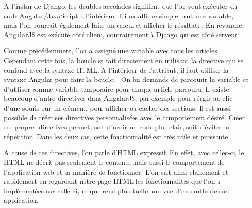 \documentclass[a4paper,10pt,twoside]{sphinxmanual}
\begin{document}
A l'instar de Django, les doubles accolades signifient que l'on veut exécuter du code Angular/JavaScript à l'intérieur. Ici on affiche simplement une variable, mais l'on pourrait également faire un calcul et afficher le résultat: . En revanche, AngularJS est exécuté côté client, contrairement à Django qui est côté serveur.

Comme précédemment, l'on a assigné une variable avec tous les articles. Cependant cette fois, la boucle se fait directement en utilisant la directive  qui se confond avec la syntaxe HTML. A l'intérieur de l'attribut, il faut utiliser la syntaxe Angular pour faire la boucle: . On lui demande de parcourir la variable  et d'utiliser comme variable temporaire  pour chaque article parcouru. Il existe beaucoup d'autre directives dans AngularJS, par exemple pour réagir au clic d'une souris sur un élément, pour afficher ou cacher des sections. Il est aussi possible de créer ses directives personnalisées avec le comportement désiré. Créer ses propres directives permet, soit d'avoir un code plus clair, soit d'éviter la répétition. Dans les deux cas, cette fonctionnalité est très utile et puissante.

A cause de ces directives, l'on parle d'HTML expressif. En effet, avec celles-ci, le HTML ne décrit pas seulement le contenu, mais aussi le comportement de l'application web et sa manière de fonctionner. L'on sait ainsi clairement et rapidement en regardant notre page HTML les fonctionnalités que l'on a implémentées sur celle-ci, ce que rend plus facile une vue d'ensemble de son application.
\end{document}
